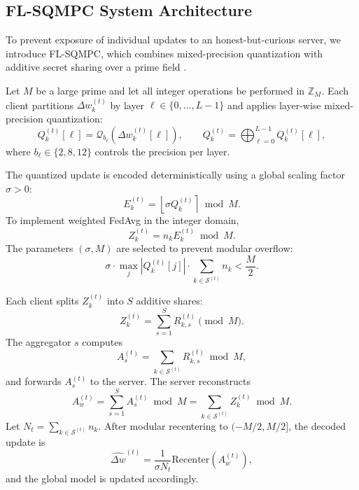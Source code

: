 \documentclass[journal,twoside,web]{ieeecolor}
\begin{document}
\subsection{FL-SQMPC System Architecture}

To prevent exposure of individual updates to an honest-but-curious server, we introduce FL-SQMPC, which combines mixed-precision quantization with additive secret sharing over a prime field \cite{shamir1979,bonawitz2017secureagg}.

Let $M$ be a large prime and let all integer operations be performed in $\mathbb{Z}_M$. 
Each client partitions $\Delta w_k^{(t)}$ by layer $\ell \in \{0,\dots,L-1\}$ and applies layer-wise mixed-precision quantization:
\begin{equation}
Q_k^{(t)}[\ell]
=
\mathcal{Q}_{b_\ell}\!\left(\Delta w_k^{(t)}[\ell]\right),
\qquad
Q_k^{(t)} =
\bigoplus_{\ell=0}^{L-1} Q_k^{(t)}[\ell],
\end{equation}
where $b_\ell \in \{2,8,12\}$ controls the precision per layer.

The quantized update is encoded deterministically using a global scaling factor $\sigma>0$:
\begin{equation}
E_k^{(t)}
=
\left\lfloor
\sigma Q_k^{(t)}
\right\rceil
\bmod M.
\end{equation}
To implement weighted FedAvg in the integer domain,
\begin{equation}
Z_k^{(t)}
=
n_k E_k^{(t)}
\bmod M.
\end{equation}
The parameters $(\sigma,M)$ are selected to prevent modular overflow:
\begin{equation}
\sigma
\cdot
\max_j |Q_k^{(t)}[j]|
\cdot
\sum_{k \in \mathcal{S}^{(t)}} n_k
<
\frac{M}{2}.
\end{equation}

Each client splits $Z_k^{(t)}$ into $S$ additive shares:
\begin{equation}
Z_k^{(t)}
=
\sum_{s=1}^{S}
R_{k,s}^{(t)}
\pmod{M}.
\end{equation}
The aggregator $s$ computes
\begin{equation}
A_s^{(t)}
=
\sum_{k \in \mathcal{S}^{(t)}}
R_{k,s}^{(t)}
\bmod M,
\end{equation}
and forwards $A_s^{(t)}$ to the server. 
The server reconstructs
\begin{equation}
A_w^{(t)}
=
\sum_{s=1}^{S}
A_s^{(t)}
\bmod M
=
\sum_{k \in \mathcal{S}^{(t)}}
Z_k^{(t)}
\bmod M.
\end{equation}
Let $N_t = \sum_{k \in \mathcal{S}^{(t)}} n_k$. 
After modular recentering to $(-M/2,M/2]$, the decoded update is
\begin{equation}
\widehat{\Delta w}^{(t)}
=
\frac{1}{\sigma N_t}
\mathrm{Recenter}\!\left(A_w^{(t)}\right),
\end{equation}
and the global model is updated accordingly.
\end{document}
